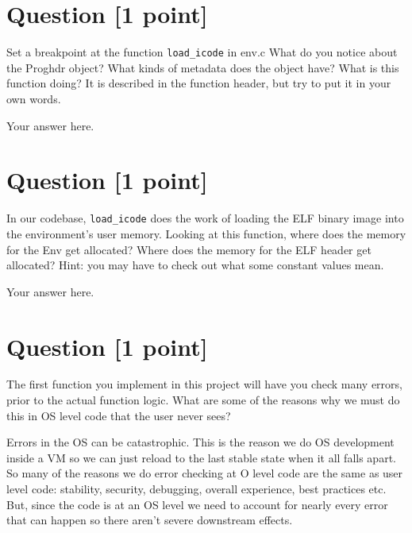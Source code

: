 \documentclass[11pt]{article}
\begin{document}
\section{Question [1 point]}

Set a breakpoint at the function \texttt{load\_icode\(\)} in env.c 
What do you notice about the Proghdr object? 
What kinds of metadata does the object have? 
What is this function doing? It is described in the function header, 
but try to put it in your own words.

\begin{solution}
Your answer here.
\end{solution}


\section{Question [1 point]}

In our codebase, \texttt{load\_icode\(\)} does the work of loading the ELF 
binary image into the environment's user memory. Looking at this function, 
where does the memory for the Env get allocated? Where does the memory for the ELF header 
get allocated? Hint: you may have to check out what some constant values mean.

\begin{solution}
Your answer here.
\end{solution}


\section{Question [1 point]}

The first function you implement in this project will have you check many errors, 
prior to the actual function logic. What are some of the reasons why we must do this 
in OS level code that the user never sees?

\begin{solution}
Errors in the OS can be catastrophic. This is the reason we do OS development inside a VM so we can just reload 
to the last stable state when it all falls apart. 
So many of the reasons we do error checking at O level code are the same as user level code: 
stability, security, debugging, overall experience, best practices etc. But, since the 
code is at an OS level we need to account for nearly every error that can happen so there aren't 
severe downstream effects. 
\end{solution}
\end{document}
